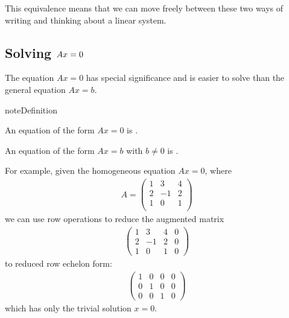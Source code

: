 \documentclass[letterpaper,10pt,english]{jupyterBook}
\begin{document}
\sphinxAtStartPar
This equivalence means that we can move freely between these two ways of writing and thinking about a linear system.


\subsection{Solving \protect\(Ax = 0\protect\)}
\label{\detokenize{LinearAlgebra/linear_systems_matrices/matrices:solving-ax-0}}
\sphinxAtStartPar
The equation \(Ax=0\) has special significance and is easier to solve than the general equation \(Ax = b\).

\begin{sphinxadmonition}{note}{Definition}

\sphinxAtStartPar
An equation of the form \(Ax = 0\) is .

\sphinxAtStartPar
An equation of the form \(Ax = b\) with \(b \neq 0\) is .
\end{sphinxadmonition}

\sphinxAtStartPar
For example, given the homogeneous equation \(Ax=0\), where
\begin{equation*}
\begin{split}A=
\begin{pmatrix}
1 & 3 & 4\\
2 & -1 & 2\\
1 & 0 & 1\\
\end{pmatrix}
\end{split}
\end{equation*}
\sphinxAtStartPar
we can use row operations to reduce the augmented matrix
\begin{equation*}
\begin{split}
\left(
\begin{array}{ccc|c}
1 & 3 & 4 & 0\\
2 & -1 & 2 & 0\\
1 & 0 & 1 & 0
\end{array}
\right)
\end{split}
\end{equation*}
\sphinxAtStartPar
to reduced row echelon form:
\begin{equation*}
\begin{split}
\left(
\begin{array}{ccc|c}
1 & 0 & 0 & 0\\
0 & 1 & 0 & 0\\
0 & 0 & 1 & 0
\end{array}
\right)
\end{split}
\end{equation*}
\sphinxAtStartPar
which has only the trivial solution \(x=0\).
\end{document}
